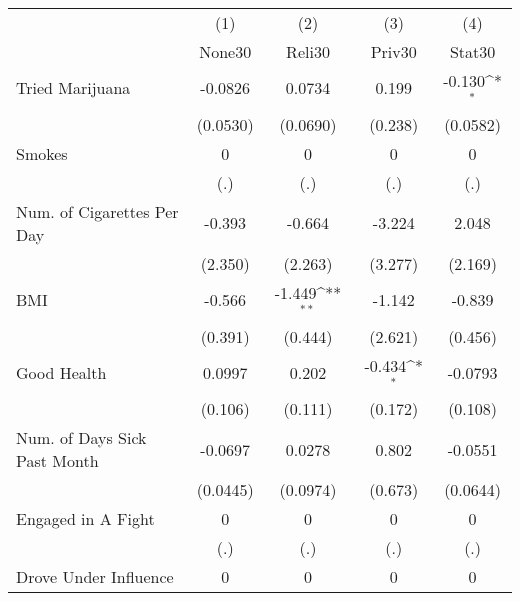 {
\def\sym#1{\ifmmode^{#1}\else\(^{#1}\)\fi}
\begin{tabular}{l*{4}{c}}
\hline\hline
            &\multicolumn{1}{c}{(1)}&\multicolumn{1}{c}{(2)}&\multicolumn{1}{c}{(3)}&\multicolumn{1}{c}{(4)}\\
            &\multicolumn{1}{c}{None30}&\multicolumn{1}{c}{Reli30}&\multicolumn{1}{c}{Priv30}&\multicolumn{1}{c}{Stat30}\\
\hline
Tried Marijuana&     -0.0826         &      0.0734         &       0.199         &      -0.130\sym{*}  \\
            &    (0.0530)         &    (0.0690)         &     (0.238)         &    (0.0582)         \\
[1em]
Smokes      &           0         &           0         &           0         &           0         \\
            &         (.)         &         (.)         &         (.)         &         (.)         \\
[1em]
Num. of Cigarettes Per Day&      -0.393         &      -0.664         &      -3.224         &       2.048         \\
            &     (2.350)         &     (2.263)         &     (3.277)         &     (2.169)         \\
[1em]
BMI         &      -0.566         &      -1.449\sym{**} &      -1.142         &      -0.839         \\
            &     (0.391)         &     (0.444)         &     (2.621)         &     (0.456)         \\
[1em]
Good Health &      0.0997         &       0.202         &      -0.434\sym{*}  &     -0.0793         \\
            &     (0.106)         &     (0.111)         &     (0.172)         &     (0.108)         \\
[1em]
Num. of Days Sick Past Month&     -0.0697         &      0.0278         &       0.802         &     -0.0551         \\
            &    (0.0445)         &    (0.0974)         &     (0.673)         &    (0.0644)         \\
[1em]
Engaged in A Fight&           0         &           0         &           0         &           0         \\
            &         (.)         &         (.)         &         (.)         &         (.)         \\
[1em]
Drove Under Influence&           0         &           0         &           0         &           0         \\

\end{tabular}}
